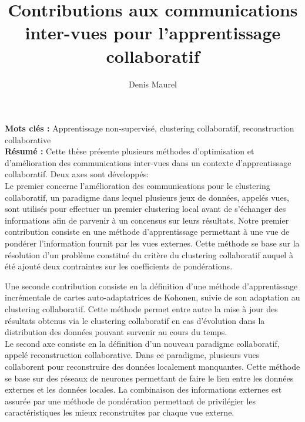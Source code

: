 \documentclass[a4paper]{article}
\begin{document}
\title{Contributions aux communications inter-vues pour l'apprentissage collaboratif}
\author{Denis Maurel}
\maketitle

\textbf{Mots clés :} \quad Apprentissage non-supervisé, clustering collaboratif, reconstruction collaborative\\%


\textbf{Résumé :} \quad Cette thèse présente plusieurs méthodes d'optimisation et d'amélioration des communications inter-vues dans un contexte d'apprentissage collaboratif. Deux axes sont développés:\\%

Le premier concerne l'amélioration des communications pour le clustering collaboratif, un paradigme dans lequel plusieurs jeux de données, appelés vues, sont utilisés pour effectuer un premier clustering local avant de s'échanger des informations afin de parvenir à un concensus sur leurs résultats. Notre premier contribution consiste en une méthode d'apprentissage permettant à une vue de pondérer l'information fournit par les vues externes. Cette méthode se base sur la résolution d'un problème constitué du critère du clustering collaboratif auquel à été ajouté deux contraintes sur les coefficients de pondérations.

Une seconde contribution consiste en la définition d'une méthode d'apprentissage incrémentale de cartes auto-adaptatrices de Kohonen, suivie de son adaptation au clustering collaboratif. Cette méthode permet entre autre la mise à jour des résultats obtenus via le clustering collaboratif en cas d'évolution dans la distribution des données pouvant survenir au cours du temps.\\

Le second axe consiste en la définition d'un nouveau paradigme collaboratif, appelé reconstruction collaborative. Dans ce paradigme, plusieurs vues collaborent pour reconstruire des données localement manquantes. Cette méthode se base sur des réseaux de neurones permettant de faire le lien entre les données externes et les données locales. La combinaison des informations externes est assurée par une méthode de pondération permettant de privilégier les caractéristiques les mieux reconstruites par chaque vue externe.
\end{document}

